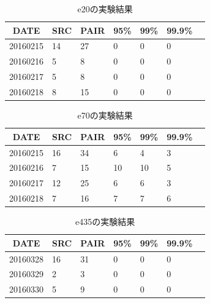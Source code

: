 \documentclass[twocolumn,10pt]{ltjsarticle}
\begin{document}
\begin{table}[htbp]
    \centering
    \caption{e20の実験結果}

    \begin{tabular}{c||llllll}
        \hline
        DATE & SRC & PAIR & 95\% & 99\% & 99.9\% \\
        \hline \hline
        20160215  & 14 & 27 & 0 & 0 & 0 \\
        20160216  & 5  & 8  & 0 & 0 & 0 \\
        20160217  & 5  & 8  & 0 & 0 & 0 \\
        20160218  & 8  & 15 & 0 & 0 & 0 \\
        \hline
    \end{tabular}
    \label{tab:e20}
\end{table}

\begin{table}[htbp]
    \centering
    \caption{e70の実験結果}

    \begin{tabular}{c||llllll}
        \hline
        DATE & SRC & PAIR & 95\% & 99\% & 99.9\% \\
        \hline \hline
        20160215  & 16 & 34 & 6  & 4  & 3 \\
        20160216  & 7  & 15 & 10 & 10 & 5 \\
        20160217  & 12 & 25 & 6  & 6  & 3 \\
        20160218  & 7  & 16 & 7  & 7  & 6 \\
        \hline
    \end{tabular}
    \label{tab:e70}
\end{table}

\begin{table}[htbp]
    \centering
    \caption{e435の実験結果}

    \begin{tabular}{c||llllll}
        \hline
        DATE & SRC & PAIR & 95\% & 99\% & 99.9\% \\
        \hline \hline
        20160328  & 16 & 31 & 0 & 0 & 0 \\
        20160329  & 2  & 3  & 0 & 0 & 0 \\
        20160330  & 5  & 9  & 0 & 0 & 0 \\
        \hline
    \end{tabular}
    
    \label{tab:e435}
\end{table}
\end{document}
